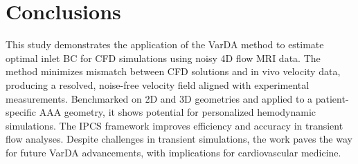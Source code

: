 \section*{Conclusions}
This study demonstrates the application of the VarDA method to estimate optimal inlet BC for CFD simulations using noisy 4D flow MRI data. The method minimizes mismatch between CFD solutions and in vivo velocity data, producing a resolved, noise-free velocity field aligned with experimental measurements. Benchmarked on 2D and 3D geometries and applied to a patient-specific AAA geometry, it shows potential for personalized hemodynamic simulations. The IPCS framework improves efficiency and accuracy in transient flow analyses. Despite challenges in transient simulations, the work paves the way for future VarDA advancements, with implications for cardiovascular medicine.







